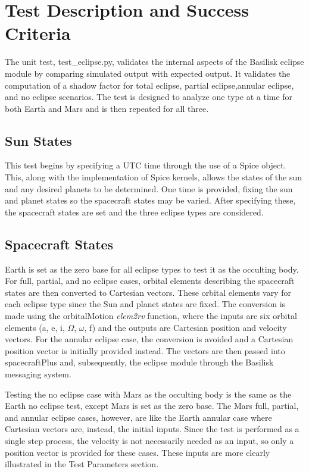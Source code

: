 \section{Test Description and Success Criteria}
The unit test, test\_eclipse.py,  validates the internal aspects of the Basilisk eclipse module by comparing simulated output with expected output. It validates the computation of a shadow factor for total eclipse, partial eclipse,annular eclipse, and no eclipse scenarios. The test is designed to analyze one type at a time for both Earth and Mars and is then repeated for all three.
\subsection{Sun States}
This test begins by specifying a UTC time through the use of a Spice object. This, along with the implementation of Spice kernels, allows the states of the sun and any desired planets to be determined. One time is provided, fixing the sun and planet states so the spacecraft states may be varied. After specifying these, the spacecraft states are set and the three eclipse types are considered.
\subsection{Spacecraft States}
Earth is set as the zero base for all eclipse types to test it as the occulting body. For full, partial, and no eclipse cases, orbital elements describing the spacecraft states are then converted to Cartesian vectors. These orbital elements vary for each eclipse type since the Sun and planet states are fixed. The conversion is made using the orbitalMotion \textit{elem2rv} function, where the inputs are six orbital elements (a, e, i, $\Omega$, $\omega$, f) and the outputs are Cartesian position and velocity vectors. For the annular eclipse case, the conversion is avoided and a Cartesian position vector is initially provided instead. The vectors are then passed into spacecraftPlus and, subsequently, the eclipse module through the Basilisk messaging system. 

Testing the no eclipse case with Mars as the occulting body is the same as the Earth no eclipse test, except Mars is set as the zero base. The Mars full, partial, and annular eclipse cases, however, are like the Earth annular case where Cartesian vectors are, instead, the initial inputs. Since the test is performed as a single step process, the velocity is not necessarily needed as an input, so only a position vector is provided for these cases. These inputs are more clearly illustrated in the Test Parameters section.
